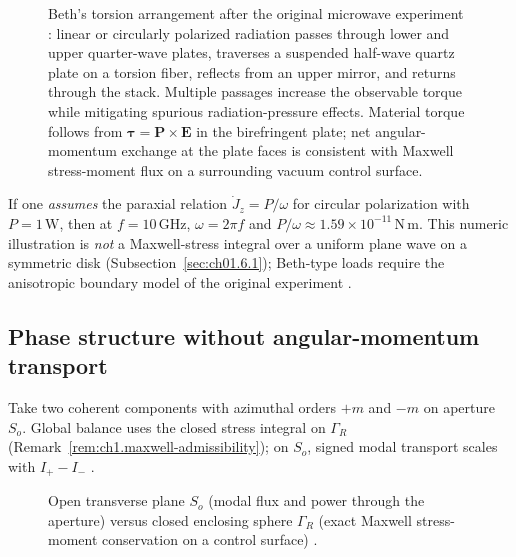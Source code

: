 \begin{figure}[t]
\centering
\VolIPhysFig{\VolIPhysBethSchematic}
\caption{Beth's torsion arrangement after the original microwave experiment \cite{beth1936}: linear or circularly polarized radiation passes through lower and upper quarter-wave plates, traverses a suspended half-wave quartz plate on a torsion fiber, reflects from an upper mirror, and returns through the stack. Multiple passages increase the observable torque while mitigating spurious radiation-pressure effects. Material torque follows from $\boldsymbol{\tau}=\mathbf P\times\mathbf E$ in the birefringent plate; net angular-momentum exchange at the plate faces is consistent with Maxwell stress-moment flux on a surrounding vacuum control surface.}
\label{fig:ch1.beth-schematic}
\end{figure}

\begin{example}
\label{ex:ch1.beth-torque}
If one \emph{assumes} the paraxial relation $\dot J_z=P/\omega$ for circular polarization with $P=1\,\mathrm{W}$, then at $f=10\,\mathrm{GHz}$, $\omega=2\pi f$ and $P/\omega\approx1.59\times10^{-11}\,\mathrm{N\,m}$. This numeric illustration is \emph{not} a Maxwell-stress integral over a uniform plane wave on a symmetric disk (Subsection~\ref{sec:ch01.6.1}); Beth-type loads require the anisotropic boundary model of the original experiment \cite{beth1936,stratton1941}.
\end{example}

\subsection{Phase structure without angular-momentum transport}
\label{sec:ch01.6.2}

Take two coherent components with azimuthal orders \(+m\) and \(-m\) on aperture \(S_o\). Global balance uses the closed stress integral on \(\Gamma_R\) (Remark~\ref{rem:ch1.maxwell-admissibility}); on \(S_o\), signed modal transport scales with \(I_+-I_-\) \cite{stratton1941,allen1992,belinfante1940}.

\begin{figure}[t]
\centering
\VolIPhysFig{\VolIPhysOpenPlaneVsClosedSphere}
\caption{Open transverse plane $S_o$ (modal flux and power through the aperture) versus closed enclosing sphere $\Gamma_R$ (exact Maxwell stress-moment conservation on a control surface) \cite{stratton1941,beth1936}.}
\label{fig:ch1.open-plane-vs-closed}
\end{figure}

